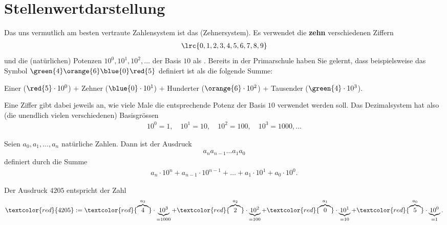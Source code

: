 \section{Stellenwertdarstellung}
\label{section:stellenwertdarst}
Das uns vermutlich am besten vertraute Zahlensystem ist das 
(Zehnersystem). Es verwendet die \textbf{zehn} verschiedenen Ziffern
\begin{align*}
	\lrc{0,1,2,3,4,5,6,7,8,9}
\end{align*}
und die (natürlichen) Potenzen $10^0, 10^1, 10^2, \ldots$ der Basis $10$ als .
Bereits in der Primarschule haben Sie gelernt, dass beispielsweise das Symbol $\green{4}\orange{6}\blue{0}\red{5}$ definiert ist als die folgende
Summe:
\begin{center}
	 Einer ($\red{5}\cdot 10^0$) $+$  Zehner ($\blue{0}\cdot 10^1$) $+$  Hunderter
	($\orange{6}\cdot 10^2$) +  Tausender
	($\green{4}\cdot 10^3$).
\end{center}
Eine Ziffer gibt dabei jeweils an, wie viele Male die entsprechende Potenz der Basis $10$ verwendet werden soll. Das
Dezimalsystem hat also (die unendlich vielen verschiedenen) Basisgrössen
\begin{align*}
	10^0=1,\quad 10^1=10,\quad 10^2=100,\quad 10^3=1000,\ldots
\end{align*}

\begin{mydefinition}[Stellenwertdarstellung]\label{mydefinition:Stellenwertdarstellung}
Seien $a_0, a_1, \ldots, a_n$ natürliche Zahlen. Dann ist der Ausdruck
\begin{align*}
	a_na_{n-1}\ldots a_1a_0
\end{align*}
definiert durch die Summe
\begin{align*}
	a_n\cdot 10^n + a_{n-1}\cdot 10^{n-1}+\ldots + a_1\cdot 10^1 + a_0\cdot 10^0.
\end{align*}
\end{mydefinition}

\begin{myexample}
Der Ausdruck $4205$ entspricht der Zahl
\begin{align*}
	\textcolor{red}{4205} := \textcolor{red}{\overbrace{4}^{a_3}}\cdot \underbrace{10^3}_{=1000} + \textcolor{red}{\overbrace{2}^{a_2}}\cdot \underbrace{10^2}_{=100} + \textcolor{red}{\overbrace{0}^{a_1}}\cdot \underbrace{10^1}_{=10} + \textcolor{red}{\overbrace{5}^{a_0}}\cdot \underbrace{10^0}_{=1}.
\end{align*}
\end{myexample}

